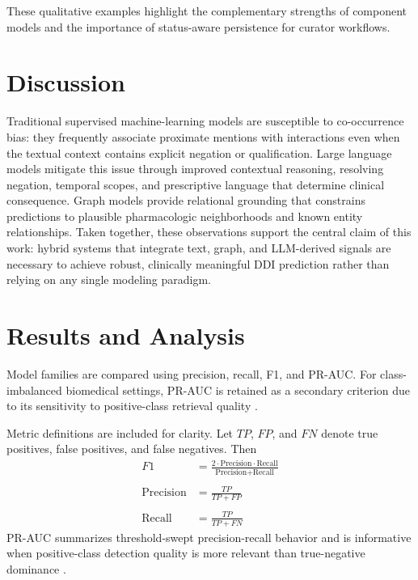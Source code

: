 \documentclass[conference]{Template/IEEEtran}
\begin{document}
These qualitative examples highlight the complementary strengths of component models and the importance of status-aware persistence for curator workflows.

\section{Discussion}
Traditional supervised machine-learning models are susceptible to co-occurrence bias: they frequently associate proximate mentions with interactions even when the textual context contains explicit negation or qualification. Large language models mitigate this issue through improved contextual reasoning, resolving negation, temporal scopes, and prescriptive language that determine clinical consequence. Graph models provide relational grounding that constrains predictions to plausible pharmacologic neighborhoods and known entity relationships. Taken together, these observations support the central claim of this work: hybrid systems that integrate text, graph, and LLM-derived signals are necessary to achieve robust, clinically meaningful DDI prediction rather than relying on any single modeling paradigm.

\section{Results and Analysis}
Model families are compared using precision, recall, F1, and PR-AUC. For class-imbalanced biomedical settings, PR-AUC is retained as a secondary criterion due to its sensitivity to positive-class retrieval quality \cite{saito2015pr}.

Metric definitions are included for clarity. Let $TP$, $FP$, and $FN$ denote true positives, false positives, and false negatives. Then
\[
\begin{aligned}
F1 &= \frac{2 \cdot \text{Precision} \cdot \text{Recall}}{\text{Precision} + \text{Recall}} \\
\\
\text{Precision} &= \frac{TP}{TP + FP} \\
\\
\text{Recall} &= \frac{TP}{TP + FN} 
\end{aligned}
\]
PR-AUC summarizes threshold-swept precision-recall behavior and is informative when positive-class detection quality is more relevant than true-negative dominance \cite{saito2015pr}.
\end{document}
